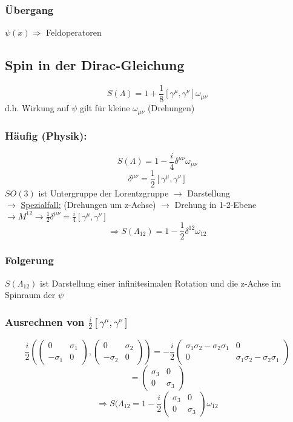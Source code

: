 \documentclass[twoside,a4paper]{scrartcl}
\renewcommand{\1}{\mathds{1}}
\newcommand{\Ra}{\Rightarrow}
\newcommand{\ra}{\rightarrow}
\renewcommand{\L}{\Lambda}
\begin{document}
\subsubsection*{Übergang}
$ \psi(x) \Ra$ Feldoperatoren 

\subsection{Spin in der Dirac-Gleichung}
$$S(\L)=1+\frac{1}{8}[\gamma^\mu,\gamma^\nu]\omega_{\mu\nu}$$
d.h. Wirkung auf $\psi$ gilt für kleine $\omega_{\mu\nu}$ (Drehungen)
\subsubsection*{Häufig (Physik):}
$$S(\L)=1-\frac{i}{4}\delta^{\mu\nu}\omega_{\mu\nu}$$
$$\delta^{\mu\nu}=\frac{1}{2}[\gamma^\mu,\gamma^\nu]$$
$SO(3)$ ist Untergruppe der Lorentzgruppe $\ra$ Darstellung\\
$\ra$ \underline{Spezialfall:} (Drehungen um z-Achse) $\ra$ Drehung in 1-2-Ebene $\ra M^{12} \ra \frac{1}{2}\delta^{\mu\nu}=\frac{i}{4}[\gamma^\mu,\gamma^\nu]$
$$\Ra S(\L_{12})=1-\frac{1}{2}\delta^{12}\omega_{12}$$

\subsubsection*{Folgerung}
$S(\L_{12})$ ist Darstellung einer infinitesimalen Rotation und die z-Achse im Spinraum der $\psi$
\subsubsection*{Ausrechnen von $\frac{i}{2}[\gamma^\mu,\gamma^\nu]$}
$$\frac{i}{2}\left( \begin{pmatrix}0 & \sigma_1 \\ -\sigma_1 & 0\end{pmatrix}, \begin{pmatrix}0 & \sigma_2 \\ -\sigma_2 & 0\end{pmatrix}\right)=-\frac{i}{2}\begin{pmatrix}\sigma_1 \sigma_2-\sigma_2\sigma_1 & 0 \\ 0 & \sigma_1 \sigma_2-\sigma_2\sigma_1\end{pmatrix}$$
$$=\begin{pmatrix}\sigma_3 & 0 \\ 0 & \sigma_3 \end{pmatrix}$$
$$\Ra S(\L_{12}=1-\frac{i}{2}\begin{pmatrix}\sigma_3 & 0 \\ 0 & \sigma_3 \end{pmatrix}\omega_{12}$$
\end{document}
